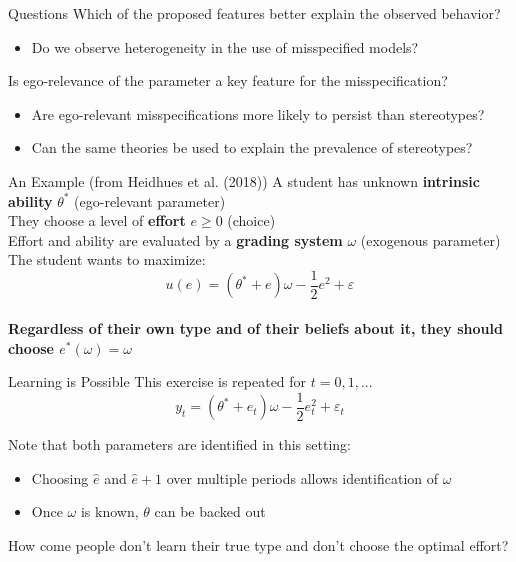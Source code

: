 \documentclass[aspectratio=169]{beamer}
\begin{document}
\begin{frame}{Questions}
    Which of the proposed features better explain the observed behavior?\\
    \begin{itemize}
        \item Do we observe heterogeneity in the use of misspecified models?
    \end{itemize}
    \bigskip

    Is ego-relevance of the parameter a key feature for the misspecification?\\
    \begin{itemize}
        \item Are ego-relevant misspecifications more likely to persist than stereotypes?
        \item Can the same theories be used to explain the prevalence of stereotypes?
        
    \end{itemize}
\end{frame}


\begin{frame}{An Example (from Heidhues et al. (2018))}
    A student has unknown \textbf{intrinsic ability} $\theta^*$ (\alert{ego-relevant parameter})\\ 
    \bigskip
    They choose a level of \textbf{effort} $e\geq 0$ (\alert{choice}) \\
    \bigskip
    Effort and ability are evaluated by a \textbf{grading system} $\omega$ (\alert{exogenous parameter})\\
    \bigskip 
    The student wants to maximize:\\
        $$u(e) = (\theta^* + e)\omega-\frac{1}{2}e^2 +\varepsilon$$\\
    
    \bigskip
   \textbf{Regardless of their own type and of their beliefs about it, they should choose $e^*(\omega)=\omega$}\\

\end{frame}

\begin{frame}{Learning is Possible}
    This exercise is repeated for $t=0, 1, ...$
        $$y_t = (\theta^* + e_t)\omega-\frac{1}{2}e_t^2 +\varepsilon_t$$
    
    Note that both parameters are identified in this setting:\\
    \bigskip
    
    \begin{itemize}
        \item Choosing $\hat{e}$ and $\hat{e}+1$ over multiple periods allows identification of $\omega$\\
        \bigskip
        \item Once $\omega$ is known, $\theta$ can be backed out\\
     \end{itemize}
    \bigskip
    How come people don't learn their true type and don't choose the optimal effort?
\end{frame}
\end{document}
